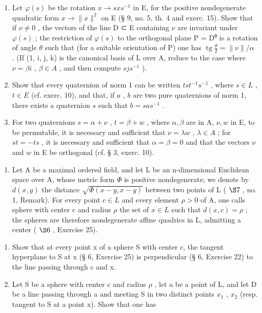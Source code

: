 \begin{enumerate}
\def\labelenumi{\alph{enumi})}
\item
  Let \(\varphi(s)\) be the rotation \(x \to sxs^{-1}\) in E, for the positive nondegenerate quadratic form \(x \to \|x\|^2\) on E (§ 9, no. 5, th. 4 and exerc. 15). Show that if \(\nu \neq 0\) , the vectors of the line D ⊂ E containing \(\nu\) are invariant under \(\varphi(s)\) ; the restriction of \(\varphi(s)\) to the orthogonal plane P = D⁰ is a rotation of angle \(\theta\) such that (for a suitable orientation of P) one has \(\operatorname{tg} \frac{\theta}{2} = \| \nu \| / \alpha\) . (If (1, i, j, k) is the canonical basis of L over A, reduce to the case where \(\nu = \beta i\) , \(\beta \in A\) , and then compute \(sjs^{-1}\) ).
\item
  Show that every quaternion of norm 1 can be written \(tst^{-1}s^{-1}\) , where \(s \in L\) , \(t \in E\) (cf. exerc. 10), and that, if \(a\) , \(b\) are two pure quaternions of norm 1, there exists a quaternion \(s\) such that \(b = sas^{-1}\) .
\item
  For two quaternions \(s = \alpha + \nu\) , \(t = \beta + w\) , where \(\alpha, \beta\) are in A, \(\nu, w\) in E, to be permutable, it is necessary and sufficient that \(\nu = \lambda w\) , \(\lambda \in A\) ; for \(st = -ts\) , it is necessary and sufficient that \(\alpha = \beta = 0\) and that the vectors \(\nu\) and \(w\) in E be orthogonal (cf. § 3, exerc. 10).
\end{enumerate}

\begin{enumerate}
\def\labelenumi{\arabic{enumi})}
\setcounter{enumi}{11}
\tightlist
\item
  Let A be a maximal ordered field, and let L be an n-dimensional Euclidean space over A, whose metric form \(\Phi\) is positive nondegenerate; we denote by \(d(x, y)\) the distance \(\sqrt{\Phi(x - y, x - y)}\) between two points of L ( \(\S 7\) , no. 1, Remark). For every point \(c \in L\) and every element \(\rho > 0\) of A, one calls sphere with center c and radius \(\rho\) the set of \(x \in L\) such that \(d(x, c) = \rho\) ; the spheres are therefore nondegenerate affine quadrics in L, admitting a center ( \(\S 6\) , Exercise 25).
\end{enumerate}

\begin{enumerate}
\def\labelenumi{\alph{enumi})}
\item
  Show that at every point x of a sphere S with center c, the tangent hyperplane to S at x (§ 6, Exercise 25) is perpendicular (§ 6, Exercise 22) to the line passing through c and x.
\item
  Let S be a sphere with center c and radius \(\rho\) , let a be a point of L, and let D be a line passing through a and meeting S in two distinct points \(x_{1}\) , \(x_{2}\) (resp. tangent to S at a point x). Show that one has
\end{enumerate}


